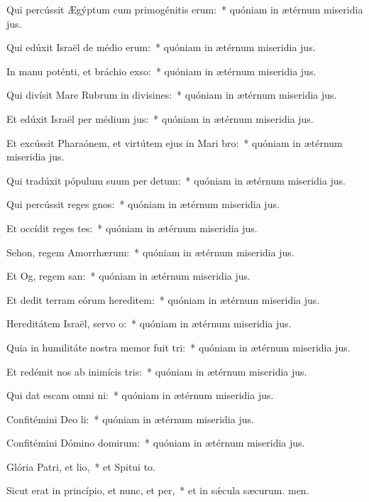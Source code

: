 \item Qui percússit Ægýptum cum primogénitis erum:~* quóniam in ætérnum miseridia jus.
\item Qui edúxit Israël de médio erum:~* quóniam in ætérnum miseridia jus.
\item In manu poténti, et bráchio exso:~* quóniam in ætérnum miseridia jus.
\item Qui divísit Mare Rubrum in divisines:~* quóniam in ætérnum miseridia jus.
\item Et edúxit Israël per médium jus:~* quóniam in ætérnum miseridia jus.
\item Et excússit Pharaónem, et virtútem ejus in Mari bro:~* quóniam in ætérnum miseridia jus.
\item Qui tradúxit pópulum suum per detum:~* quóniam in ætérnum miseridia jus.
\item Qui percússit reges gnos:~* quóniam in ætérnum miseridia jus.
\item Et occídit reges tes:~* quóniam in ætérnum miseridia jus.
\item Sehon, regem Amorrhærum:~* quóniam in ætérnum miseridia jus.
\item Et Og, regem san:~* quóniam in ætérnum miseridia jus.
\item Et dedit terram eórum hereditem:~* quóniam in ætérnum miseridia jus.
\item Hereditátem Israël, servo o:~* quóniam in ætérnum miseridia jus.
\item Quia in humilitáte nostra memor fuit tri:~* quóniam in ætérnum miseridia jus.
\item Et redémit nos ab inimícis tris:~* quóniam in ætérnum miseridia jus.
\item Qui dat escam omni ni:~* quóniam in ætérnum miseridia jus.
\item Confitémini Deo li:~* quóniam in ætérnum miseridia jus.
\item Confitémini Dómino domirum:~* quóniam in ætérnum miseridia jus.
\item Glória Patri, et lio,~* et Spitui to.
\item Sicut erat in princípio, et nunc, et per,~* et in sǽcula sæcurum. men.
